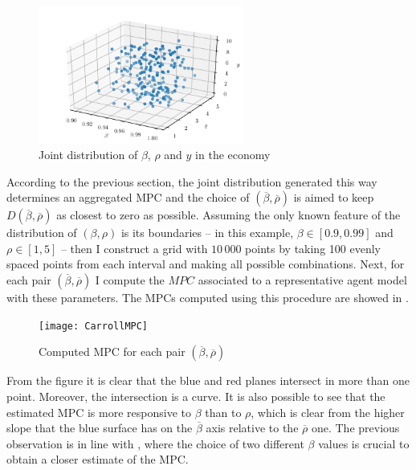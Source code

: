 \documentclass[english, a4paper, 12pt]{article}
\begin{document}
	
	\begin{figure}[H]
		\caption{Joint distribution of $\beta$, $\rho$ and $y$ in the economy}
		\label{fig:JointDistrib}
		\includegraphics[width=0.6\textwidth]{CarrollDistrib3d}
	\end{figure}

According to the previous section, the joint distribution generated this way determines an aggregated MPC and the choice of $(\overline{\beta}, \overline{\rho})$ is aimed to keep $D(\overline{\beta}, \overline{\rho})$ as closest to zero as possible. Assuming the only known feature of the distribution of $(\beta, \rho)$ is its boundaries -- in this example, $\beta \in [0.9, 0.99]$ and $\rho \in [1,5]$ -- then I construct a grid with $10\,000$ points by taking 100 evenly spaced points from each interval and making all possible combinations. Next, for each pair $(\overline{\beta}, \overline{\rho})$ I compute the $MPC$ associated to a representative agent model with these parameters. The MPCs computed using this procedure are showed in . 
	\begin{figure}[H]
		\caption{Computed MPC for each pair $(\overline{\beta}, \overline{\rho})$}
		\label{fig:MPCPlane}
		\texttt{[image: CarrollMPC]}
	\end{figure}

\newpage
From the figure it is clear that the blue and red planes intersect in more than one point. Moreover, the intersection is a curve. It is also possible to see that the estimated MPC is more responsive to $\beta$ than to $\rho$, which is clear from the higher slope that the blue surface has on the $\overline{\beta}$ axis relative to the $\overline{\rho}$ one. The previous observation is in line with \cite{CarrollRequiem}, where the choice of two different $\beta$ values is crucial to obtain a closer estimate of the MPC. 
\end{document}
